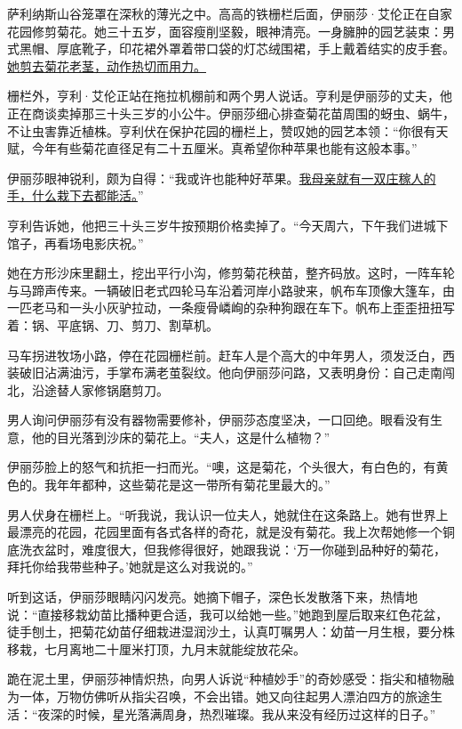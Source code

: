 \documentclass[11pt,a4paper]{ctexart}
\begin{document}
\begin{materialtext}
萨利纳斯山谷笼罩在深秋的薄光之中。高高的铁栅栏后面，伊丽莎·艾伦正在自家花园修剪菊花。她三十五岁，面容瘦削坚毅，眼神清亮。一身臃肿的园艺装束：男式黑帽、厚底靴子，印花裙外罩着带口袋的灯芯绒围裙，手上戴着结实的皮手套。\uline{她剪去菊花老茎，动作热切而用力。}

栅栏外，亨利·艾伦正站在拖拉机棚前和两个男人说话。亨利是伊丽莎的丈夫，他正在商谈卖掉那三十头三岁的小公牛。伊丽莎细心排查菊花苗周围的蚜虫、蜗牛，不让虫害靠近植株。亨利伏在保护花园的栅栏上，赞叹她的园艺本领：“你很有天赋，今年有些菊花直径足有二十五厘米。真希望你种苹果也能有这般本事。”

伊丽莎眼神锐利，颇为自得：“我或许也能种好苹果。\uline{我母亲就有一双庄稼人的手，什么栽下去都能活。}”

亨利告诉她，他把三十头三岁牛按预期价格卖掉了。“今天周六，下午我们进城下馆子，再看场电影庆祝。”

她在方形沙床里翻土，挖出平行小沟，修剪菊花秧苗，整齐码放。这时，一阵车轮与马蹄声传来。一辆破旧老式四轮马车沿着河岸小路驶来，帆布车顶像大篷车，由一匹老马和一头小灰驴拉动，一条瘦骨嶙峋的杂种狗跟在车下。帆布上歪歪扭扭写着：锅、平底锅、刀、剪刀、割草机。

马车拐进牧场小路，停在花园栅栏前。赶车人是个高大的中年男人，须发泛白，西装破旧沾满油污，手掌布满老茧裂纹。他向伊丽莎问路，又表明身份：自己走南闯北，沿途替人家修锅磨剪刀。

男人询问伊丽莎有没有器物需要修补，伊丽莎态度坚决，一口回绝。眼看没有生意，他的目光落到沙床的菊花上。“夫人，这是什么植物？”

伊丽莎脸上的怒气和抗拒一扫而光。“噢，这是菊花，个头很大，有白色的，有黄色的。我年年都种，这些菊花是这一带所有菊花里最大的。”

男人伏身在栅栏上。“听我说，我认识一位夫人，她就住在这条路上。她有世界上最漂亮的花园，花园里面有各式各样的奇花，就是没有菊花。我上次帮她修一个铜底洗衣盆时，难度很大，但我修得很好，她跟我说：‘万一你碰到品种好的菊花，拜托你给我带些种子。’她就是这么对我说的。”

听到这话，伊丽莎眼睛闪闪发亮。她摘下帽子，深色长发散落下来，热情地说：“直接移栽幼苗比播种更合适，我可以给她一些。”她跑到屋后取来红色花盆，徒手刨土，把菊花幼苗仔细栽进湿润沙土，认真叮嘱男人：幼苗一月生根，要分株移栽，七月离地二十厘米打顶，九月末就能绽放花朵。

跪在泥土里，伊丽莎神情炽热，向男人诉说“种植妙手”的奇妙感受：指尖和植物融为一体，万物仿佛听从指尖召唤，不会出错。她又向往起男人漂泊四方的旅途生活：“夜深的时候，星光落满周身，热烈璀璨。我从来没有经历过这样的日子。”


\end{materialtext}
\end{document}
